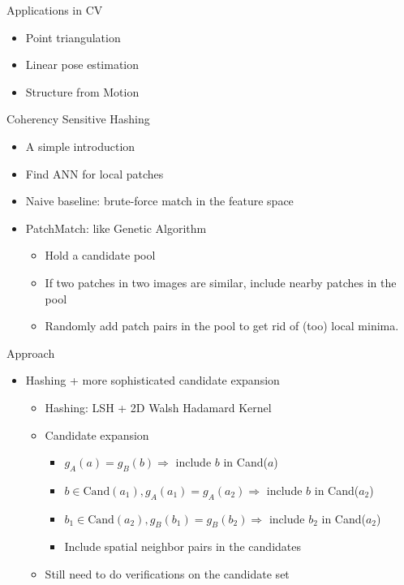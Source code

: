 \documentclass[12pt]{beamer}
\begin{document}
\begin{frame}{Applications in CV}
    \begin{itemize}
        \item Point triangulation
        \item Linear pose estimation
        \item Structure from Motion
    \end{itemize}
\end{frame}


\begin{frame}{Coherency Sensitive Hashing}
    \begin{itemize}
        \item A simple introduction
        \item Find ANN for local patches
        \item Naive baseline: brute-force match in the feature space
        \item PatchMatch: like Genetic Algorithm
        \begin{itemize}
            \item Hold a candidate pool
            \item If two patches in two images are similar, include nearby patches in the pool
            \item Randomly add patch pairs in the pool to get rid of (too) local minima.
        \end{itemize}
    \end{itemize}
\end{frame}

\begin{frame}{Approach}
    \begin{itemize}
        \item Hashing + more sophisticated candidate expansion
        \begin{itemize}
            \item Hashing: LSH + 2D Walsh Hadamard Kernel
            \item Candidate expansion
            \begin{itemize}
                \item $g_A(a) = g_B(b) \Rightarrow $ include $b$ in Cand($a$)
                \item $b \in \text{Cand}(a_1), g_A(a_1) = g_A(a_2) \Rightarrow$ include $b$ in Cand($a_2$)
                \item $b_1 \in \text{Cand}(a_2), g_B(b_1) = g_B(b_2) \Rightarrow$ include $b_2$ in Cand($a_2$)
                \item Include spatial neighbor pairs in the candidates
            \end{itemize}
            \item Still need to do verifications on the candidate set
        \end{itemize}
    \end{itemize}
\end{frame}
\end{document}
